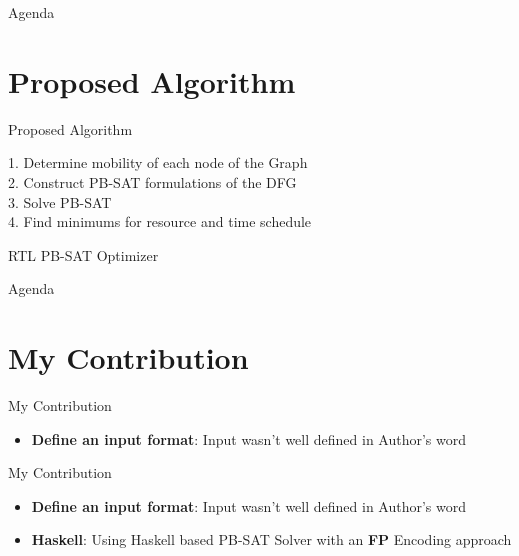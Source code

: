 \documentclass{beamer}
\begin{document}
 \begin{frame}{Agenda}
  \section{Proposed Algorithm}
  \tableofcontents[currentsection]
\end{frame}

\begin{frame}[fragile]{Proposed Algorithm}
  \begin{algorithm}[H]
    1. Determine mobility of each node of the Graph\\
    2. Construct PB-SAT formulations of the DFG\\
    3. Solve PB-SAT\\
    4. Find minimums for resource and time schedule
   \caption{RTL PB-SAT Optimizer}
  \end{algorithm}
\end{frame}
 
\begin{frame}{Agenda}
  \section{My Contribution}
  \tableofcontents[currentsection]
\end{frame}

\begin{frame}[fragile]{My Contribution}
  \begin{block}{}
    \begin{itemize}
      \item \textbf{Define an input format}: Input wasn't well defined in Author's word
    \end{itemize}
  \end{block}
\end{frame}

\begin{frame}[fragile]{My Contribution}
  \begin{block}{}
    \begin{itemize}
      \item \textbf{Define an input format}: Input wasn't well defined in Author's word
      \item \textbf{Haskell}: Using Haskell based PB-SAT Solver with an \textbf{FP} Encoding approach
    \end{itemize}
  \end{block}
\end{frame}
\end{document}
